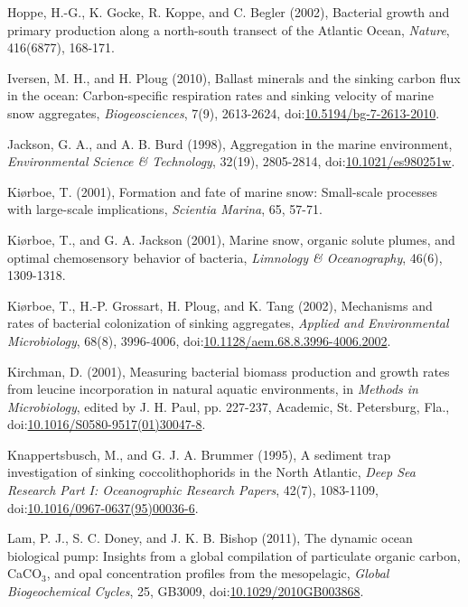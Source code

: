 \begin{singlespace}
{{Hoppe, H.-G., K. Gocke, R. Koppe, and C. Begler (2002), Bacterial growth and primary production along a north-south transect of the Atlantic Ocean, \emph{Nature}, 416(6877), 168-171.

Iversen, M. H., and H. Ploug (2010), Ballast minerals and the sinking carbon flux in the ocean: Carbon-specific respiration rates and sinking velocity of marine snow aggregates, \emph{Biogeosciences}, 7(9), 2613-2624, doi:\href{http://dx.doi.org/10.5194/bg-7-2613-2010}{10.5194/bg-7-2613-2010}.

Jackson, G. A., and A. B. Burd (1998), Aggregation in the marine environment, \emph{Environmental Science \& Technology}, 32(19), 2805-2814, doi:\href{http://dx.doi.org/10.1021/es980251w}{10.1021/es980251w}.

Ki\o{}rboe, T. (2001), Formation and fate of marine snow: Small-scale processes with large-scale implications, \emph{Scientia Marina}, 65, 57-71.

Ki\o{}rboe, T., and G. A. Jackson (2001), Marine snow, organic solute plumes, and optimal chemosensory behavior of bacteria, \emph{Limnology \& Oceanography}, 46(6), 1309-1318.

Ki\o{}rboe, T., H.-P. Grossart, H. Ploug, and K. Tang (2002), Mechanisms and rates of bacterial colonization of sinking aggregates, \emph{Applied and Environmental Microbiology}, 68(8), 3996-4006, doi:\href{http://dx.doi.org/10.1128/aem.68.8.3996-4006.2002}{10.1128/aem.68.8.3996-4006.2002}.

Kirchman, D. (2001), Measuring bacterial biomass production and growth rates from leucine incorporation in natural aquatic environments, in \emph{Methods in Microbiology}, edited by J. H. Paul, pp. 227-237, Academic, St. Petersburg, Fla., doi:\href{http://dx.doi.org/10.1016/S0580-9517\%2801\%2930047-8}{10.1016/S0580-9517(01)30047-8}.

Knappertsbusch, M., and G. J. A. Brummer (1995), A sediment trap investigation of sinking coccolithophorids in the North Atlantic, \emph{Deep Sea Research Part I: Oceanographic Research Papers}, 42(7), 1083-1109, doi:\href{http://dx.doi.org/10.1016/0967-0637\%2895\%2900036-6}{10.1016/0967-0637(95)00036-6}.

Lam, P. J., S. C. Doney, and J. K. B. Bishop (2011), The dynamic ocean biological pump: Insights from a global compilation of particulate organic carbon, CaCO$_3$, and opal concentration profiles from the mesopelagic, \emph{Global Biogeochemical Cycles}, 25, GB3009, doi:\href{http://dx.doi.org/10.1029/2010GB003868}{10.1029/2010GB003868}.

}}
\end{singlespace}

